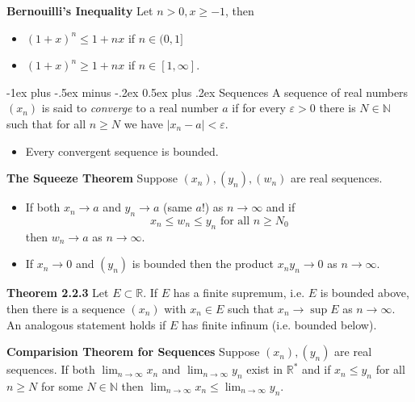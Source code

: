 \documentclass[10pt,landscape]{article}
\makeatletter
\renewcommand{\section}{\@startsection{section}{1}{0mm}%
                                {-1ex plus -.5ex minus -.2ex}%
                                {0.5ex plus .2ex}%
                                {\normalfont\large\bfseries}}
\makeatother
\begin{document}
\begin{multicols}{3}
	\textbf{Bernouilli's Inequality} Let $n > 0, x \geq -1$, then %
	\begin{itemize}
		\item $(1+x)^n \leq 1+nx$ if $n \in (0,1]$ 
		\item $(1+x)^n \geq 1+nx$ if $n \in [1,\infty].$ 
	\end{itemize}

\section{Sequences}
A sequence of real numbers $(x_n)$ is said to \emph{converge} to a real number $a$ if for every $\varepsilon>0$ there is $N \in \mathbb{N}$ such that for all $n \geq N$ we have $|x_n -a| < \varepsilon$.

\begin{itemize}
	\item Every convergent sequence is bounded.
\end{itemize}

\textbf{The Squeeze Theorem} Suppose $(x_n), (y_n),(w_n)$ are real sequences.

\begin{itemize}
	\item If both $x_n \rightarrow a$ and $y_n \rightarrow a$ (same $a$!) as $n \rightarrow \infty$ and if \[ x_n \leq w_n \leq y_n \text{ for all } n \geq N_0 \] then $w_n \rightarrow a$ as $n \rightarrow \infty$.
	\item If $x_n \rightarrow 0$ and $(y_n)$ is bounded then the product $x_n y_n \rightarrow 0 $ as $n \rightarrow \infty$. 
\end{itemize}

\textbf{Theorem 2.2.3} Let $E \subset \mathbb{R}$. If $E$ has a finite supremum, i.e. $E$ is bounded above, then there is a sequence $(x_n)$ with $x_n \in E$ such that $x_n \rightarrow \sup E$ as $n \rightarrow \infty$. An analogous statement holds if $E$ has finite infinum (i.e. bounded below).

\textbf{Comparision Theorem for Sequences} Suppose $(x_n), (y_n) $ are real sequences. If both $\displaystyle \lim_{n \rightarrow \infty} x_n$ and $\displaystyle \lim_{n \rightarrow \infty} y_n$ exist in $\mathbb{R}^{*}$ and if $x_n \leq y_n$ for all $n \geq N$ for some $N \in \mathbb{N}$ then $\displaystyle  \lim_{n \rightarrow \infty} x_n \leq \displaystyle  \lim_{n \rightarrow \infty} y_n$.


\end{multicols}
\end{document}
